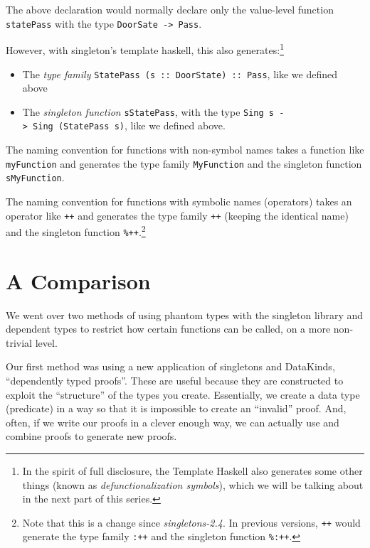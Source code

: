\documentclass[]{article}
\begin{document}
The above declaration would normally declare only the value-level function
\texttt{statePass} with the type \texttt{DoorSate\ -\textgreater{}\ Pass}.

However, with singleton's template haskell, this also generates:\footnote{In the
  spirit of full disclosure, the Template Haskell also generates some other
  things (known as \emph{defunctionalization symbols}), which we will be talking
  about in the next part of this series.}

\begin{itemize}
\tightlist
\item
  The \emph{type family} \texttt{StatePass\ (s\ ::\ DoorState)\ ::\ Pass}, like
  we defined above
\item
  The \emph{singleton function} \texttt{sStatePass}, with the type
  \texttt{Sing\ s\ -\textgreater{}\ Sing\ (StatePass\ s)}, like we defined
  above.
\end{itemize}

The naming convention for functions with non-symbol names takes a function like
\texttt{myFunction} and generates the type family \texttt{MyFunction} and the
singleton function \texttt{sMyFunction}.

The naming convention for functions with symbolic names (operators) takes an
operator like \texttt{++} and generates the type family \texttt{++} (keeping the
identical name) and the singleton function \texttt{\%++}.\footnote{Note that
  this is a change since \emph{singletons-2.4}. In previous versions,
  \texttt{++} would generate the type family \texttt{:++} and the singleton
  function \texttt{\%:++}.}

\hypertarget{a-comparison}{%
\section{A Comparison}\label{a-comparison}}

We went over two methods of using phantom types with the singleton library and
dependent types to restrict how certain functions can be called, on a more
non-trivial level.

Our first method was using a new application of singletons and DataKinds,
``dependently typed proofs''. These are useful because they are constructed to
exploit the ``structure'' of the types you create. Essentially, we create a data
type (predicate) in a way so that it is impossible to create an ``invalid''
proof. And, often, if we write our proofs in a clever enough way, we can
actually use and combine proofs to generate new proofs.
\end{document}
